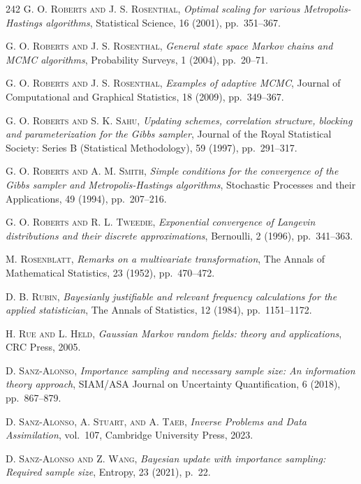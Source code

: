 \begin{thebibliography}{242}
\textsc{G. O. Roberts and J. S. Rosenthal},
\textit{Optimal scaling for various Metropolis-Hastings algorithms},
Statistical Science, 16 (2001), pp.\ 351--367.

\textsc{G. O. Roberts and J. S. Rosenthal},
\textit{General state space Markov chains and MCMC algorithms},
Probability Surveys, 1 (2004), pp.\ 20--71.

\textsc{G. O. Roberts and J. S. Rosenthal},
\textit{Examples of adaptive MCMC},
Journal of Computational and Graphical Statistics, 18 (2009), pp.\ 349--367.

\textsc{G. O. Roberts and S. K. Sahu},
\textit{Updating schemes, correlation structure, blocking and parameterization for the Gibbs sampler},
Journal of the Royal Statistical Society: Series B (Statistical Methodology), 59 (1997), pp.\ 291--317.

\textsc{G. O. Roberts and A. M. Smith},
\textit{Simple conditions for the convergence of the Gibbs sampler and Metropolis-Hastings algorithms},
Stochastic Processes and their Applications, 49 (1994), pp.\ 207--216.

\textsc{G. O. Roberts and R. L. Tweedie},
\textit{Exponential convergence of Langevin distributions and their discrete approximations},
Bernoulli, 2 (1996), pp.\ 341--363.

\textsc{M. Rosenblatt},
\textit{Remarks on a multivariate transformation},
The Annals of Mathematical Statistics, 23 (1952), pp.\ 470--472.

\textsc{D. B. Rubin},
\textit{Bayesianly justifiable and relevant frequency calculations for the applied statistician},
The Annals of Statistics, 12 (1984), pp.\ 1151--1172.

\textsc{H. Rue and L. Held},
\textit{Gaussian Markov random fields: theory and applications},
CRC Press, 2005.

\textsc{D. Sanz-Alonso},
\textit{Importance sampling and necessary sample size: An information theory approach},
SIAM/ASA Journal on Uncertainty Quantification, 6 (2018), pp.\ 867--879.

\textsc{D. Sanz-Alonso, A. Stuart, and A. Taeb},
\textit{Inverse Problems and Data Assimilation},
vol.\ 107, Cambridge University Press, 2023.

\textsc{D. Sanz-Alonso and Z. Wang},
\textit{Bayesian update with importance sampling: Required sample size},
Entropy, 23 (2021), p.\ 22.


\end{thebibliography}

